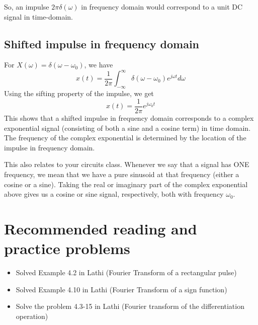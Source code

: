 \documentclass{ee102_notes}
\begin{document}
So, an impulse $2\pi \delta(\omega)$ in frequency domain would correspond to a unit DC signal in time-domain.

\subsection{Shifted impulse in frequency domain}
For $X(\omega) = \delta(\omega - \omega_0)$, we have
\begin{equation*}
    x(t) = \frac{1}{2\pi} \int_{-\infty}^{\infty} \delta(\omega - \omega_0) e^{j\omega t} d\omega
\end{equation*}
Using the sifting property of the impulse, we get
\begin{equation*}
    x(t) = \frac{1}{2\pi} e^{j\omega_0 t}
\end{equation*}
This shows that a shifted impulse in frequency domain corresponds to a complex exponential signal (consisting of both a sine and a cosine term) in time domain. The frequency of the complex exponential is determined by the location of the impulse in frequency domain. 

This also relates to your circuits class. Whenever we say that a signal has ONE frequency, we mean that we have a pure sinusoid at that frequency (either a cosine or a sine). Taking the real or imaginary part of the complex exponential above gives us a cosine or sine signal, respectively, both with frequency $\omega_0$.

\section{Recommended reading and practice problems}
\begin{itemize}
    \item Solved Example 4.2 in Lathi (Fourier Transform of a rectangular pulse)
    \item Solved Example 4.10 in Lathi (Fourier Transform of a sign function)
    \item Solve the problem 4.3-15 in Lathi (Fourier transform of the differentiation operation)
\end{itemize}
\end{document}

